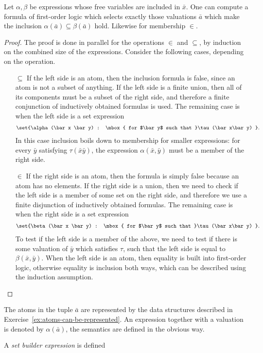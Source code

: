  
 \begin{fact}\label{fact:expressions-to-fo}
 	Let $\alpha,\beta$ be expressions whose free variables are included in $\bar x$. One can compute a formula of first-order logic
	 which selects exactly those valuations $\bar a$ which make the inclusion $\alpha(\bar a) \subseteq \beta(\bar a)$ hold. Likewise for membership $\in$.
 \end{fact}
 \begin{proof}
 	The proof is done in parallel for the operations $\in$ and $\subseteq$, by induction on the combined size of the expressions. Consider the following cases, depending on the operation.

 	\begin{itemize}
 		\item[$\subseteq$] If the left side is an atom, then the inclusion formula is false, since an atom is not a subset of anything. If the left side is a finite union, then all of its components must be a subset of the right side, and therefore a finite conjunction of inductively obtained formulas is used. The remaining case is when the left side is a set expression
 		\begin{align*}
 			\set{\alpha(\bar x \bar y) : \mbox{ for $\bar y$ such that }\tau(\bar x\bar y) }.
 		\end{align*}
 In this case inclusion boils down to membership for smaller expressions: for every $\bar y$ satisfying $\tau(\bar x \bar y)$, the expression $\alpha(\bar x,\bar y)$ must be a member of the right side.
	
 		\item[$\in$] If the right side is an atom, then the formula is simply false because an atom has no elements.
 		If the right side is a union, then we need to check if the left side is a member of some set on the right side, and therefore we use a finite disjunction of inductively obtained formulas. The remaining case is when the right side 
 	is a set expression 
 	\begin{align*}
 			\set{\beta(\bar x \bar y) : \mbox{ for $\bar y$ such that }\tau(\bar x\bar y) }.
 	\end{align*}
 	To test if the left side is a member of the above, we need to test if there is some valuation of $ \bar y$ which satisfies $\tau$, such that the left side is equal to $\beta(\bar x,\bar y)$. When the left side is an atom, then equality is built into first-order logic, otherwise equality is inclusion both ways, which can be described using the induction assumption.
 	\end{itemize}
	
 \end{proof}
 
 The atoms in the tuple $\bar a$ are represented by the data structures described in Exercise~\ref{ex:atoms-can-be-represented}. An expression together with a valuation is denoted by $\alpha(\bar a)$, the semantics are defined in the obvious way.%


A \emph{set builder expression} is defined
